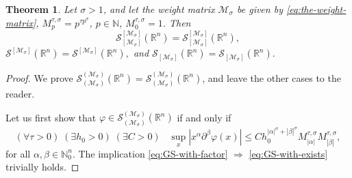 \documentclass{article}
\theoremstyle{thmstyleone}
\newtheorem{Theorem}{Theorem}[section]%
\theoremstyle{thmstyletwo}%
\theoremstyle{thmstylethree}%
\begin{document}
\begin{Theorem} \label{thm:with-or-without-h}
Let $\sigma>1$, and let the weight matrix $\mathcal{M}_\sigma$ be given by 
\eqref{eq:the-weight-matrix}, 
$ M_{p}^{\tau,\sigma}=p^{\tau p^\sigma}$, $ p\in \mathbb{N}$, $ M_0^{\tau,\sigma}=1$.
Then 
\begin{equation}
\mathcal S_{[\mathcal{M}_\sigma ] }^{ [\mathcal{M}_\sigma]} (\mathbb R^n)
= \mathscr S_{[\mathcal{M}_\sigma ] }^{ [\mathcal{M}_\sigma ]} (\mathbb R^n),    
\end{equation}
$\mathcal S^{ [\mathcal{M}_\sigma]} (\mathbb R^n)
= \mathscr S^{ [\mathcal{M}_\sigma ]} (\mathbb R^n),$
and 
$\mathcal S_{[\mathcal{M}_\sigma ] } (\mathbb R^n)
= \mathscr S_{[\mathcal{M}_\sigma ] } (\mathbb R^n).$
\end{Theorem}

\begin{proof}
We prove $ \mathcal S_{(\mathcal{M}_\sigma ) }^{ (\mathcal{M}_\sigma)} (\mathbb R^n)
= \mathscr S_{(\mathcal{M}_\sigma ) }^{ (\mathcal{M}_\sigma )} (\mathbb R^n)$,
and leave the other cases to the reader.

Let us first show that 
$ \varphi \in \mathscr S_{(\mathcal{M}_\sigma ) }^{ (\mathcal{M}_\sigma )} (\mathbb R^n)$
if and only if
\begin{equation} \label{eq:GS-with-exists}
  (\forall \tau>0) \;(\exists h_0>0)\;(\exists C >0) \;\;\;
   \sup_{x} |x^\alpha \partial^\beta \varphi(x)|\leq 
   C h_0 ^{|\alpha|^\sigma + |\beta|^\sigma } M^{\tau, \sigma}_{|\alpha|} 
   M^{\tau, \sigma}_{|\beta|},
  \end{equation}
for all $  \alpha,\beta\in\mathbb N_0^n$.
The implication \eqref{eq:GS-with-factor} $ \Rightarrow$
 \eqref{eq:GS-with-exists} trivially holds. 
 

\end{proof}
\end{document}
